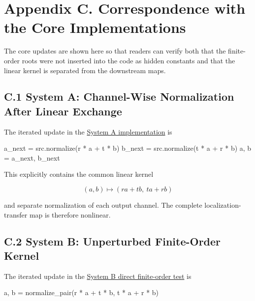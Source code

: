 \documentclass[
  a4paper,
  10pt]{article}
\newenvironment{Shaded}{}{}
\newcommand{\NormalTok}[1]{#1}
\newcommand{\OperatorTok}[1]{\textcolor[rgb]{0.40,0.40,0.40}{#1}}
\begin{document}
\section{Appendix C. Correspondence with the Core
Implementations}\label{appendix-c-correspondence-with-the-core-implementations}

The core updates are shown here so that readers can verify both that the
finite-order roots were not inserted into the code as hidden constants
and that the linear kernel is separated from the downstream maps.

\subsection{C.1 System A: Channel-Wise Normalization After Linear
Exchange}\label{c1-system-a-channel-wise-normalization-after-linear-exchange}

The iterated update in the
\href{../20260715/run_system_A_localization_exchange_R_sweep_preliminary_v1.py}{System
A implementation} is

\begin{Shaded}
\begin{Highlighting}[]
\NormalTok{a\_next }\OperatorTok{=}\NormalTok{ src.normalize(r }\OperatorTok{*}\NormalTok{ a }\OperatorTok{+}\NormalTok{ t }\OperatorTok{*}\NormalTok{ b)}
\NormalTok{b\_next }\OperatorTok{=}\NormalTok{ src.normalize(t }\OperatorTok{*}\NormalTok{ a }\OperatorTok{+}\NormalTok{ r }\OperatorTok{*}\NormalTok{ b)}
\NormalTok{a, b }\OperatorTok{=}\NormalTok{ a\_next, b\_next}
\end{Highlighting}
\end{Shaded}

This explicitly contains the common linear kernel

\[
(a,b)\mapsto(ra+tb,\ ta+rb)
\]

and separate normalization of each output channel. The complete
localization-transfer map is therefore nonlinear.

\subsection{C.2 System B: Unperturbed Finite-Order
Kernel}\label{c2-system-b-unperturbed-finite-order-kernel}

The iterated update in the
\href{../20260715/run_minimal_system_B_gray_direct_check_v5.py}{System B
direct finite-order test} is

\begin{Shaded}
\begin{Highlighting}[]
\NormalTok{a, b }\OperatorTok{=}\NormalTok{ normalize\_pair(r }\OperatorTok{*}\NormalTok{ a }\OperatorTok{+}\NormalTok{ t }\OperatorTok{*}\NormalTok{ b, t }\OperatorTok{*}\NormalTok{ a }\OperatorTok{+}\NormalTok{ r }\OperatorTok{*}\NormalTok{ b)}
\end{Highlighting}
\end{Shaded}
\end{document}
